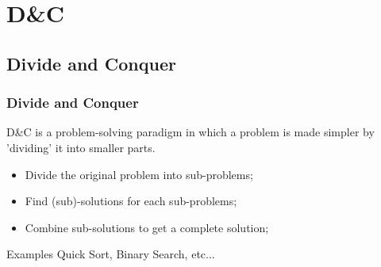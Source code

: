 \documentclass{beamer}
\begin{document}








\section{D\&C}
\subsection{Divide and Conquer}
\begin{frame}
  \frametitle{Divide and Conquer}

  D\&C is a problem-solving paradigm in which a problem is made
  simpler by 'dividing' it into smaller parts.

  \begin{itemize}
  \item Divide the original problem into sub-problems;
  \item Find (sub)-solutions for each sub-problems;
  \item Combine sub-solutions to get a complete solution;
  \end{itemize}

  \begin{block}{Examples}
    Quick Sort, Binary Search, etc...
  \end{block}
\end{frame}
\end{document}

